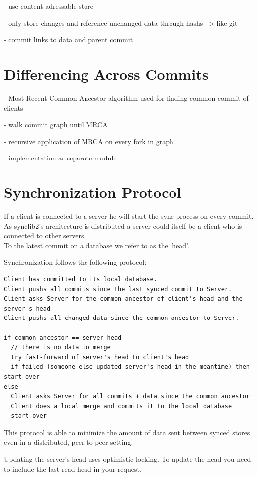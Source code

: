 - use content-adressable store

- only store changes and reference unchanged data through hashs --> like git

- commit links to data and parent commit

\section{Differencing Across Commits}
- Most Recent Common Ancestor algorithm used for finding common commit of clients

- walk commit graph until MRCA

- recursive application of MRCA on every fork in graph

- implementation as separate module

\section{Synchronization Protocol}
If a client is connected to a server he will start the sync process on every commit. As
synclib2's architecture is distributed a server could itself be a client
who is connected to other servers.\\To the latest commit on a database
we refer to as the `head'.

Synchronization follows the following protocol:

\begin{verbatim}
Client has committed to its local database.
Client pushs all commits since the last synced commit to Server.
Client asks Server for the common ancestor of client's head and the server's head
Client pushs all changed data since the common ancestor to Server.

if common ancestor == server head
  // there is no data to merge
  try fast-forward of server's head to client's head
  if failed (someone else updated server's head in the meantime) then start over
else
  Client asks Server for all commits + data since the common ancestor
  Client does a local merge and commits it to the local database
  start over
\end{verbatim}

This protocol is able to minimize the amount of data sent between synced
stores even in a distributed, peer-to-peer setting.

Updating the server's head uses optimistic locking. To update the head
you need to include the last read head in your request.

